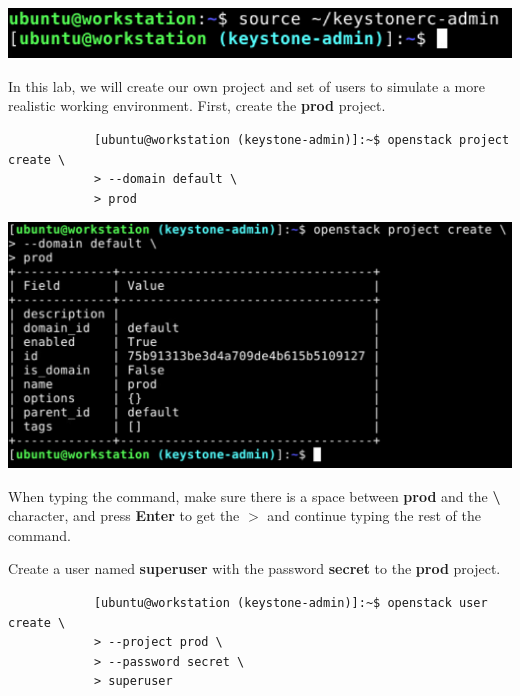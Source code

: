 \documentclass[letterpaper, 12pt]{article}
\begin{document}
\begin{enumerate}
\begin{labstep}
        \begin{center}
            \includegraphics[width=\linewidth]{images/part1/step3.png}
        \end{center}
    \end{labstep}

    \begin{labstep}
        In this lab, we will create our own project and set of users to simulate a more realistic working environment.
        First, create the \textbf{prod} project.
        \begin{lstlisting}
            [ubuntu@workstation (keystone-admin)]:~$ openstack project create \
            > --domain default \
            > prod
        \end{lstlisting}

        \begin{center}
            \includegraphics[width=\linewidth]{images/part1/step4.png}
        \end{center}
    \end{labstep}

    \begin{tipbox}
        When typing the command, make sure there is a space between \textbf{prod} and the \textbf{\textbackslash} character, and press \textbf{Enter} to get the \textbf{$>$} and continue typing the rest of the command.
    \end{tipbox}

    \begin{labstep}
        Create a user named \textbf{superuser} with the password \textbf{secret} to the \textbf{prod} project.
        \begin{lstlisting}
            [ubuntu@workstation (keystone-admin)]:~$ openstack user create \
            > --project prod \
            > --password secret \
            > superuser
        \end{lstlisting}


\end{labstep}
\end{enumerate}
\end{document}
